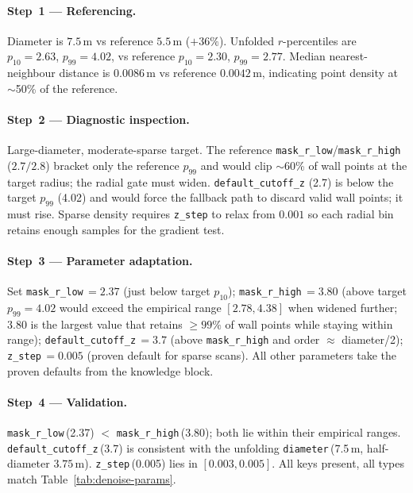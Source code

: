 \paragraph{Step~1 --- Referencing.}
Diameter is $7.5$\,m vs reference $5.5$\,m ($+36\%$). Unfolded $r$-percentiles are $p_{10}=2.63$, $p_{99}=4.02$, vs reference $p_{10}=2.30$, $p_{99}=2.77$. Median nearest-neighbour distance is $0.0086$\,m vs reference $0.0042$\,m, indicating point density at $\sim$50\% of the reference.

\paragraph{Step~2 --- Diagnostic inspection.}
Large-diameter, moderate-sparse target. The reference \texttt{mask\_r\_low}/\texttt{mask\_r\_high} ($2.7/2.8$) bracket only the reference $p_{99}$ and would clip $\sim$60\% of wall points at the target radius; the radial gate must widen. \texttt{default\_cutoff\_z} (2.7) is below the target $p_{99}$ (4.02) and would force the fallback path to discard valid wall points; it must rise. Sparse density requires \texttt{z\_step} to relax from $0.001$ so each radial bin retains enough samples for the gradient test.

\paragraph{Step~3 --- Parameter adaptation.}
Set \texttt{mask\_r\_low}\,$=2.37$ (just below target $p_{10}$); \texttt{mask\_r\_high}\,$=3.80$ (above target $p_{99}=4.02$ would exceed the empirical range $[2.78, 4.38]$ when widened further; $3.80$ is the largest value that retains $\geq 99\%$ of wall points while staying within range); \texttt{default\_cutoff\_z}\,$=3.7$ (above \texttt{mask\_r\_high} and order $\approx$ diameter/2); \texttt{z\_step}\,$=0.005$ (proven default for sparse scans). All other parameters take the proven defaults from the knowledge block.

\paragraph{Step~4 --- Validation.}
\texttt{mask\_r\_low}\,(2.37) $<$ \texttt{mask\_r\_high}\,(3.80); both lie within their empirical ranges. \texttt{default\_cutoff\_z}\,(3.7) is consistent with the unfolding \texttt{diameter}\,(7.5\,m, half-diameter $3.75$\,m). \texttt{z\_step}\,(0.005) lies in $[0.003, 0.005]$. All keys present, all types match Table~\ref{tab:denoise-params}.

